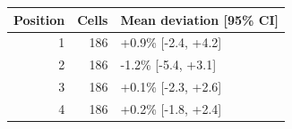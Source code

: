 \begin{tabular}{rrl}
\toprule
Position & Cells & Mean deviation [95\% CI] \\
\midrule
1 & 186 & +0.9\% [-2.4, +4.2] \\
2 & 186 & -1.2\% [-5.4, +3.1] \\
3 & 186 & +0.1\% [-2.3, +2.6] \\
4 & 186 & +0.2\% [-1.8, +2.4] \\
\bottomrule
\end{tabular}
